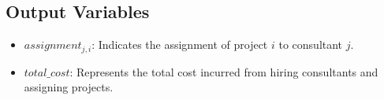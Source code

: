 \documentclass{article}
\begin{document}
\subsection*{Output Variables}
\begin{itemize}
    \item $assignment_{j,i}$: Indicates the assignment of project $i$ to consultant $j$.
    \item $total\_cost$: Represents the total cost incurred from hiring consultants and assigning projects.
\end{itemize}
\end{document}
